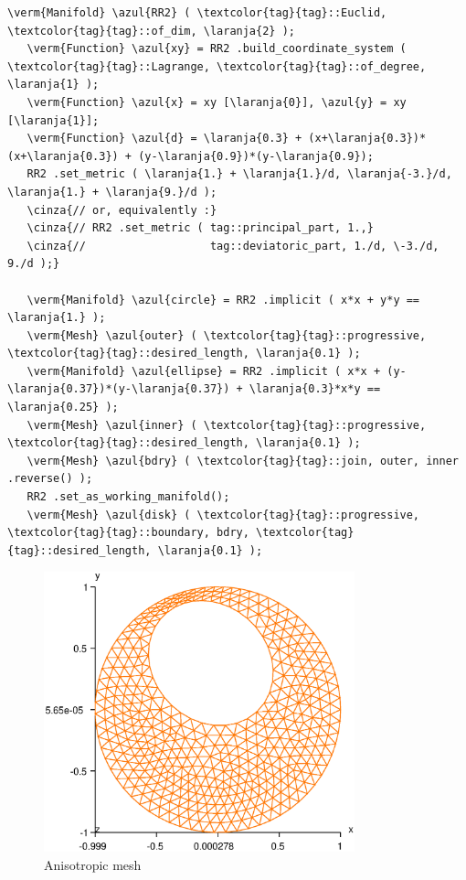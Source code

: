 \begin{Verbatim}[commandchars=\\\{\},formatcom=\small\tt,frame=single,
   label=code not working,rulecolor=\color{coment},
   baselinestretch=0.94,framesep=2mm                                  ]
   \verm{Manifold} \azul{RR2} ( \textcolor{tag}{tag}::Euclid, \textcolor{tag}{tag}::of_dim, \laranja{2} );
   \verm{Function} \azul{xy} = RR2 .build_coordinate_system ( \textcolor{tag}{tag}::Lagrange, \textcolor{tag}{tag}::of_degree, \laranja{1} );
   \verm{Function} \azul{x} = xy [\laranja{0}], \azul{y} = xy [\laranja{1}];
   \verm{Function} \azul{d} = \laranja{0.3} + (x+\laranja{0.3})*(x+\laranja{0.3}) + (y-\laranja{0.9})*(y-\laranja{0.9});
   RR2 .set_metric ( \laranja{1.} + \laranja{1.}/d, \laranja{-3.}/d, \laranja{1.} + \laranja{9.}/d );
   \cinza{// or, equivalently :}
   \cinza{// RR2 .set_metric ( tag::principal_part, 1.,}
   \cinza{//                   tag::deviatoric_part, 1./d, \-3./d, 9./d );}

   \verm{Manifold} \azul{circle} = RR2 .implicit ( x*x + y*y == \laranja{1.} );
   \verm{Mesh} \azul{outer} ( \textcolor{tag}{tag}::progressive, \textcolor{tag}{tag}::desired_length, \laranja{0.1} );
   \verm{Manifold} \azul{ellipse} = RR2 .implicit ( x*x + (y-\laranja{0.37})*(y-\laranja{0.37}) + \laranja{0.3}*x*y == \laranja{0.25} );
   \verm{Mesh} \azul{inner} ( \textcolor{tag}{tag}::progressive, \textcolor{tag}{tag}::desired_length, \laranja{0.1} );
   \verm{Mesh} \azul{bdry} ( \textcolor{tag}{tag}::join, outer, inner .reverse() );
   RR2 .set_as_working_manifold();
   \verm{Mesh} \azul{disk} ( \textcolor{tag}{tag}::progressive, \textcolor{tag}{tag}::boundary, bdry, \textcolor{tag}{tag}::desired_length, \laranja{0.1} );
\end{Verbatim}

\begin{figure} \centering
 \includegraphics[width=90mm]{disk-anisotrop}
  \caption{Anisotropic mesh}
  \label{\numb section 3.\numb fig 11}
\end{figure}

